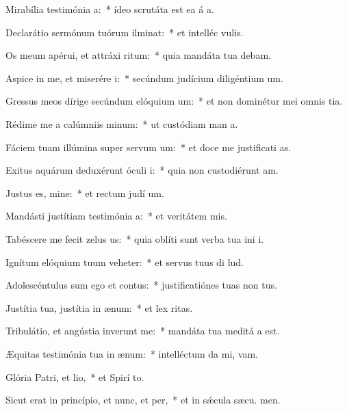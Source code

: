 \item Mirabília testimónia a:~* ídeo scrutáta est ea á a.
\item Declarátio sermónum tuórum ilminat:~* et intelléc  vulis.
\item Os meum apérui, et attráxi ritum:~* quia mandáta tua debam.
\item Aspice in me, et miserére i:~* secúndum judícium diligéntium  um.
\item Gressus meos dírige secúndum elóquium um:~* et non dominétur mei omnis tia.
\item Rédime me a calúmniis minum:~* ut custódiam man a.
\item Fáciem tuam illúmina super servum um:~* et doce me justificati as.
\item Exitus aquárum deduxérunt óculi i:~* quia non custodiérunt  am.
\item Justus es, mine:~* et rectum judí um.
\item Mandásti justítiam testimónia a:~* et veritátem  mis.
\item Tabéscere me fecit zelus us:~* quia oblíti sunt verba tua ini i.
\item Ignítum elóquium tuum veheter:~* et servus tuus di lud.
\item Adolescéntulus sum ego et contus:~* justificatiónes tuas non  tus.
\item Justítia tua, justítia in ænum:~* et lex  ritas.
\item Tribulátio, et angústia inverunt me:~* mandáta tua meditá a est.
\item Æquitas testimónia tua in ænum:~* intelléctum da mi,  vam.
\item Glória Patri, et lio,~* et Spirí to.
\item Sicut erat in princípio, et nunc, et per,~* et in sǽcula sæcu. men.
